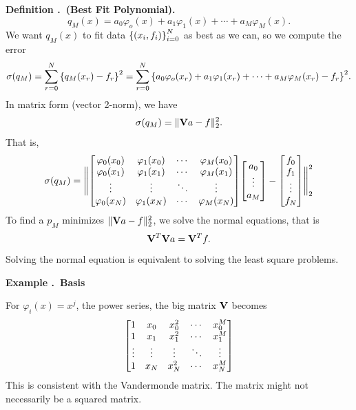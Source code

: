 \documentclass[12pt, a4paper]{article}
\newcounter{index}[subsection]
\newenvironment*{df}[1]{\par\noindent\textbf{Definition \thesubsection.\stepcounter{index}\theindex\ (#1).}}{\par}
\newenvironment*{eg}[1]{\begin{framed}\par\noindent\textbf{Example \thesubsection.\stepcounter{index}\theindex\ #1} \par}{\par\end{framed}}
\def\phi{\varphi}
\begin{document}
\begin{df}{Best Fit Polynomial}
	\[q_M(x)=a_0\phi_o(x)+a_1\phi_1(x)+\cdots+a_M\phi_M(x).\] We want $q_M(x)$ to fit data $\qty{(x_i,f_i)}_{i=0}^N$ as best as we can, so we compute the error \[\sigma(q_M)=\sum_{r=0}^N\qty{q_M(x_r)-f_r}^2=\sum_{r=0}^N\qty{a_0\phi_o(x_r)+a_1\phi_1(x_r)+\cdots+a_M\phi_M(x_r)-f_r}^2.\] In matrix form (vector 2-norm), we have \[\sigma(q_M)=\|\vb Va-f\|_2^2.\] That is, \[\sigma(q_M)=\Bigg\|\mqty[\phi_0(x_0)&\phi_1(x_0)&\cdots&\phi_M(x_0)\\\phi_0(x_1)&\phi_1(x_1)&\cdots&\phi_M(x_1)\\\vdots&\vdots&\ddots&\vdots\\\phi_0(x_N)&\phi_1(x_N)&\cdots&\phi_M(x_N)]\mqty[a_0\\\vdots\\a_M]-\mqty[f_0\\f_1\\\vdots\\f_N]\Bigg\|_2^2\] To find a $p_M$ minimizes $\|\vb Va-f\|_2^2$, we solve the normal equations, that is \[\vb V^T\vb Va=\vb V^Tf.\] Solving the normal equation is equivalent to solving the least square problems.
\end{df}
\begin{eg}{Basis}
	For $\phi_i(x)=x^j$, the power series, the big matrix $\vb V$ becomes \[\mqty[1&x_0&x_0^2&\cdots&x_0^M\\1&x_1&x_1^2&\cdots&x_1^M\\\vdots&\vdots&\vdots&\ddots&\vdots\\ 1&x_N&x_N^2&\cdots&x_N^M]\]	This is consistent with the Vandermonde matrix. The matrix might not necessarily be a squared matrix. 
\end{eg}
\end{document}

